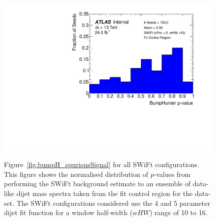 \begin{figure}[!htb]
 {                                                    
  \includegraphics[width=0.32\linewidth, angle=0]{figs/Dibjet/LowMass/FitStudy_min566/pVal_bumpHunter_corrFitCR_5para_low10_high10.pdf}
}
\caption[Figure~\ref{fig:bumpH_spuriousSignal} for all SWiFt configurations.]
 {\label{fig:app-bumpH_spuriousSignal}
 Figure~\ref{fig:bumpH_spuriousSignal} for all SWiFt configurations.
  This figure shows the normalised distribution of \bh{} $p$-values from performing the SWiFt background estimate to an ensemble of
  data-like dijet mass spectra taken from the fit control region for the \lm{} data-set.
  The SWiFt configurations considered use the 4 and 5 parameter dijet fit function for a window half-width ($wHW$) range of 10 to 16.
}
\end{figure}


